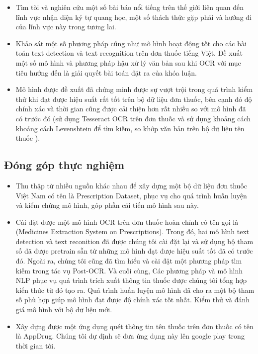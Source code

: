 \begin{itemize}
    \item Tìm tòi và nghiên cứu một số bài báo nổi tiếng trên thế giới liên quan đến lĩnh vực nhận diện
ký tự quang học, một số thách thức gặp phải và hướng đi của lĩnh vực này trong tương lai.
    \item Khảo sát một số phương pháp cũng như mô hình hoạt động tốt cho các bài toán text
detection và text recognition trên đơn thuốc tiếng Việt. Đề xuất một số mô hình và phương
pháp hậu xử lý văn bản sau khi OCR với mục tiêu hướng đến là giải quyết bài toán đặt ra
của khóa luận.
    \item Mô hình được đề xuất đã chứng minh được sự vượt trội trong quá trình kiểm thử khi đạt
được hiệu suất rất tốt trên bộ dữ liệu đơn thuốc, bên cạnh đó độ chính xác và thời gian cũng
được cải thiện hơn rất nhiều so với mô hình đã có trước đó (sử dụng Tesseract OCR trên
đơn thuốc và sử dụng khoảng cách khoảng cách Levenshtein để tìm kiếm, so khớp văn bản
trên bộ dữ liệu tên thuốc \cite{nguyen2021developing}).
\end{itemize}

\subsection{Đóng góp thực nghiệm}

\begin{itemize}
    \item Thu thập từ nhiều nguồn khác nhau để xây dựng một bộ dữ liệu đơn thuốc Việt Nam có tên là Prescription Dataset, phục
vụ cho quá trình huấn luyện và kiểm chứng mô hình, góp phần cải tiến mô hình sau này.
        \item Cài đặt được một mô hình OCR trên đơn thuốc hoàn chỉnh có tên gọi là  (Medicines
Extraction System on Prescriptions). Trong đó, hai mô hình text detection và text reconition
đã được chúng tôi cài đặt lại và sử dụng bộ tham số đã được pretrain sẵn từ những mô hình
đạt được hiệu suất tốt đã có trước đó. Ngoài ra, chúng tôi cũng đã tìm hiểu và cài đặt một phương pháp tìm kiếm trong tác vụ Post-OCR. Và cuối cùng, Các phương pháp và mô hình NLP phục vụ quá trình trích xuất thông tin thuốc được chúng tôi tổng hợp kiến thức từ đó tạo ra. Quá trình huấn luyện mô hình đã
cho ra một bộ tham số phù hợp giúp mô hình đạt được độ chính xác tốt nhất. Kiểm thử và
đánh giá mô hình với bộ dữ liệu mới.
    \item Xây dựng được một ứng dụng quét thông tin tên thuốc trên đơn thuốc có tên là AppDrug.
Chúng tôi dự định sẽ đưa ứng dụng này lên google play trong thời gian tới.
\end{itemize}


